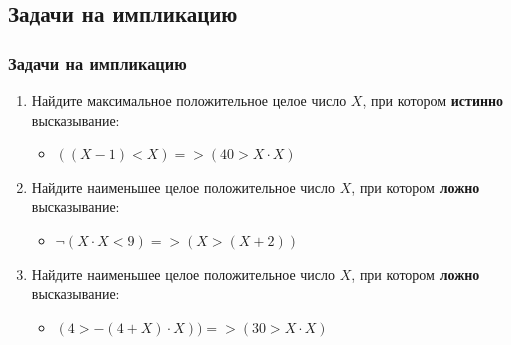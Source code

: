 \documentclass[compress,red]{beamer}
\begin{document}
\subsection{Задачи на импликацию}
\begin{frame}[fragile]
  \frametitle{Задачи на импликацию}
  \begin{enumerate}
    \item Найдите максимальное положительное целое число $X$, при котором \textbf{истинно} высказывание:
        \begin{itemize}
            \item $((X - 1) < X) => (40 > X\cdot X)$
        \end{itemize}
    \item Найдите наименьшее целое положительное число $X$, при котором \textbf{ложно} высказывание:
         \begin{itemize}
             \item ${\neg}(X\cdot X < 9) => (X >(X + 2))$
         \end{itemize}
    \item Найдите наименьшее целое положительное число $X$, при котором \textbf{ложно} высказывание:
        \begin{itemize}
            \item $(4 > -(4 + X)\cdot X)) => (30 > X\cdot X)$
        \end{itemize}
  \end{enumerate}
\end{frame}
\end{document}
